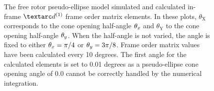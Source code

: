 \begin{figure}
\begin{tabular}{@{}cc@{}}
  \end{tabular}
  \caption[Free rotor pseudo-ellipse simulated and calculated in-frame $\FOone$ elements.]{
    The free rotor pseudo-ellipse model simulated and calculated in-frame $\FOone$ frame order matrix elements.
    In these plots, $\theta_\textrm{X}$ corresponds to the cone opening half-angle $\theta_x$ and $\theta_\textrm{Y}$ to the cone opening half-angle $\theta_y$.
    When the half-angle is not varied, the angle is fixed to either $\theta_x = \pi/4$ or $\theta_y = 3\pi/8$.
    Frame order matrix values have been calculated every 10 degrees.
    The first angle for the calculated elements is set to 0.01 degrees as a pseudo-ellipse cone opening angle of 0.0 cannot be correctly handled by the numerical integration.
  }
  \label{fig: simulated and calculated in-frame 1st degree pseudo-ellipse, free rotor frame order}
\end{figure}

